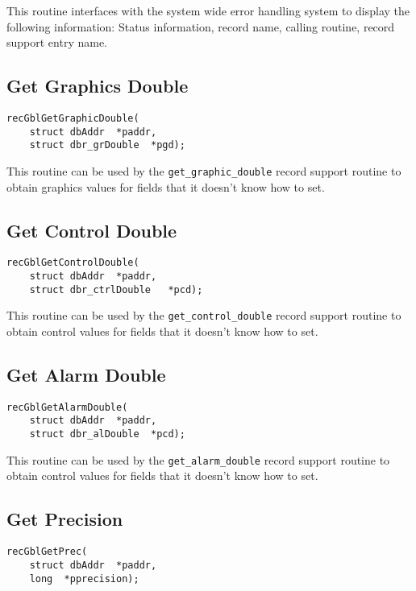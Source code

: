 This routine interfaces with the system wide error handling system to display the following information:
Status information, record name, calling routine, record support entry name.

\subsection{Get Graphics Double}

\begin{verbatim}
recGblGetGraphicDouble(
    struct dbAddr  *paddr,
    struct dbr_grDouble  *pgd);
\end{verbatim}

This routine can be used by the \verb|get_graphic_double| record support routine to obtain graphics values for fields that 
it doesn't know how to set.

\subsection{Get Control Double}

\begin{verbatim}
recGblGetControlDouble(
    struct dbAddr  *paddr,
    struct dbr_ctrlDouble   *pcd);
\end{verbatim}

This routine can be used by the \verb|get_control_double| record support routine to obtain control values for fields that it 
doesn't know how to set.

\subsection{Get Alarm Double}

\begin{verbatim}
recGblGetAlarmDouble(
    struct dbAddr  *paddr,
    struct dbr_alDouble  *pcd);
\end{verbatim}

This routine can be used by the \verb|get_alarm_double| record support routine to obtain control values for fields that it 
doesn't know how to set.

\subsection{Get Precision}

\begin{verbatim}
recGblGetPrec(
    struct dbAddr  *paddr,
    long  *pprecision);
\end{verbatim}

